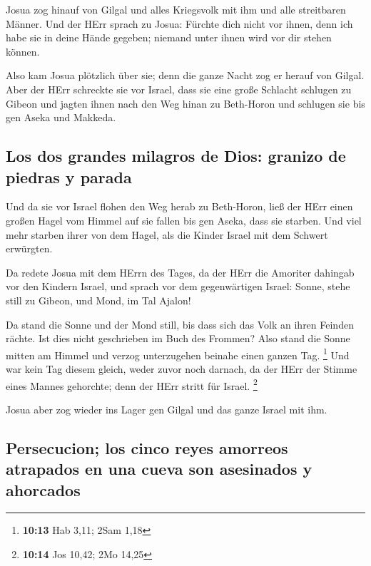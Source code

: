  Josua zog hinauf von Gilgal und alles Kriegsvolk mit ihm
und alle streitbaren Männer.  Und der HErr sprach zu
Josua: Fürchte dich nicht vor ihnen, denn ich habe sie in deine Hände
gegeben; niemand unter ihnen wird vor dir stehen können.

 Also kam Josua plötzlich über sie; denn die ganze Nacht
zog er herauf von Gilgal.  Aber der HErr schreckte sie
vor Israel, dass sie eine große Schlacht schlugen zu Gibeon und jagten
ihnen nach den Weg hinan zu Beth-Horon und schlugen sie bis gen Aseka
und Makkeda.

\hypertarget{los-dos-grandes-milagros-de-dios-granizo-de-piedras-y-parada}{%
\subsection{Los dos grandes milagros de Dios: granizo de piedras y
parada}\label{los-dos-grandes-milagros-de-dios-granizo-de-piedras-y-parada}}

 Und da sie vor Israel flohen den Weg herab zu
Beth-Horon, ließ der HErr einen großen Hagel vom Himmel auf sie fallen
bis gen Aseka, dass sie starben. Und viel mehr starben ihrer von dem
Hagel, als die Kinder Israel mit dem Schwert erwürgten.

 Da redete Josua mit dem HErrn des Tages, da der HErr die
Amoriter dahingab vor den Kindern Israel, und sprach vor dem
gegenwärtigen Israel: Sonne, stehe still zu Gibeon, und Mond, im Tal
Ajalon!

 Da stand die Sonne und der Mond still, bis dass sich das
Volk an ihren Feinden rächte. Ist dies nicht geschrieben im Buch des
Frommen? Also stand die Sonne mitten am Himmel und verzog unterzugehen
beinahe einen ganzen Tag. \footnote{\textbf{10:13} Hab 3,11; 2Sam 1,18}
 Und war kein Tag diesem gleich, weder zuvor noch
darnach, da der HErr der Stimme eines Mannes gehorchte; denn der HErr
stritt für Israel. \footnote{\textbf{10:14} Jos 10,42; 2Mo 14,25}

 Josua aber zog wieder ins Lager gen Gilgal und das ganze
Israel mit ihm.

\hypertarget{persecucion-los-cinco-reyes-amorreos-atrapados-en-una-cueva-son-asesinados-y-ahorcados}{%
\subsection{Persecucion; los cinco reyes amorreos atrapados en una cueva
son asesinados y
ahorcados}\label{persecucion-los-cinco-reyes-amorreos-atrapados-en-una-cueva-son-asesinados-y-ahorcados}}

